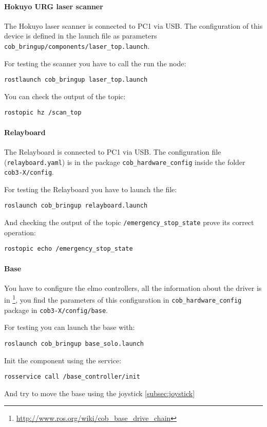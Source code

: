\paragraph{Hokuyo URG laser scanner}
The Hokuyo laser scanner is connected to PC1 via USB. The configuration of this device is defined in the launch file as parameters \texttt{cob\_bringup/components/laser\_top.launch}.

For testing the scanner you have to call the run the node:
\begin{lstlisting}
rostlaunch cob_bringup laser_top.launch
\end{lstlisting}

You can check the output of the topic:
\begin{lstlisting}
rostopic hz /scan_top
\end{lstlisting}

\paragraph{Relayboard}
The Relayboard is connected to PC1 via USB. The configuration file (\texttt{relayboard.yaml}) is in the package \texttt{cob\_hardware\_config} inside the folder \texttt{cob3-X/config}.

For testing the Relayboard you have to launch the file:
\begin{lstlisting}
roslaunch cob_bringup relayboard.launch
\end{lstlisting}

And checking the output of the topic \texttt{/emergency\_stop\_state} prove its correct operation:
\begin{lstlisting}
rostopic echo /emergency_stop_state
\end{lstlisting}

\paragraph{Base}
You have to configure the elmo controllers, all the information about the driver is in \footnote{\url{http://www.ros.org/wiki/cob_base_drive_chain}}, you find the parameters of this configuration in \texttt{cob\_hardware\_config} package in \texttt{cob3-X/config/base}.

For testing you can launch the base with:
\begin{lstlisting}
roslaunch cob_bringup base_solo.launch
\end{lstlisting}
Init the component using the service:
\begin{lstlisting}
rosservice call /base_controller/init
\end{lstlisting}
And try to move the base using the joystick \ref{subsec:joystick}

